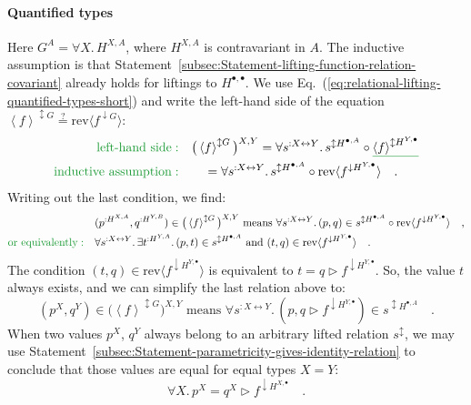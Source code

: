\paragraph{Quantified types}

Here $G^{A}=\forall X.\,H^{X,A}$, where $H^{X,A}$ is contravariant
in $A$. The inductive assumption is that Statement~\ref{subsec:Statement-lifting-function-relation-covariant}
already holds for liftings to $H^{\bullet,\bullet}$. We use Eq.~(\ref{eq:relational-lifting-quantified-types-short})
and write the left-hand side of the equation $\left<f\right>^{\updownarrow G}\overset{?}{=}\text{rev}\langle f^{\downarrow G}\rangle$:
\begin{align*}
{\color{greenunder}\text{left-hand side}:}\quad & \big(\left<f\right>^{\updownarrow G}\big)^{X,Y}=\forall s^{:X\leftrightarrow Y}.\,s^{\updownarrow H^{\bullet,A}}\circ\gunderline{\left<f\right>^{\updownarrow H^{Y,\bullet}}}\\
{\color{greenunder}\text{inductive assumption}:}\quad & \quad=\forall s^{:X\leftrightarrow Y}.\,s^{\updownarrow H^{\bullet,A}}\circ\text{rev}\langle f^{\downarrow H^{Y,\bullet}}\rangle\quad.
\end{align*}
Writing out the last condition, we find:
\begin{align*}
 & (p^{:H^{X,A}},q^{:H^{Y,B}})\in\big(\left<f\right>^{\updownarrow G}\big)^{X,Y}\text{ means }\forall s^{:X\leftrightarrow Y}.\,(p,q)\in s^{\updownarrow H^{\bullet,A}}\circ\text{rev}\langle f^{\downarrow H^{Y,\bullet}}\rangle\quad,\\
{\color{greenunder}\text{or equivalently}:}\quad & \forall s^{:X\leftrightarrow Y}.\,\exists t^{:H^{Y,A}}.\,(p,t)\in s^{\updownarrow H^{\bullet,A}}\text{ and }(t,q)\in\text{rev}\langle f^{\downarrow H^{Y,\bullet}}\rangle\quad.
\end{align*}
The condition $(t,q)\in\text{rev}\langle f^{\downarrow H^{Y,\bullet}}\rangle$
is equivalent to $t=q\triangleright f^{\downarrow H^{Y,\bullet}}$.
So, the value $t$ always exists, and we can simplify the last relation
above to:
\[
(p^{X},q^{Y})\in\big(\left<f\right>^{\updownarrow G}\big)^{X,Y}\text{ means }\forall s^{:X\leftrightarrow Y}.\,(p,q\triangleright f^{\downarrow H^{Y,\bullet}})\in s^{\updownarrow H^{\bullet,A}}\quad.
\]
When two values $p^{X}$, $q^{Y}$ always belong to an arbitrary lifted
relation $s^{\updownarrow}$, we may use Statement~\ref{subsec:Statement-parametricity-gives-identity-relation}
to conclude that those values are equal for equal types $X=Y$:
\[
\forall X.\,p^{X}=q^{X}\triangleright f^{\downarrow H^{X,\bullet}}\quad.
\]

